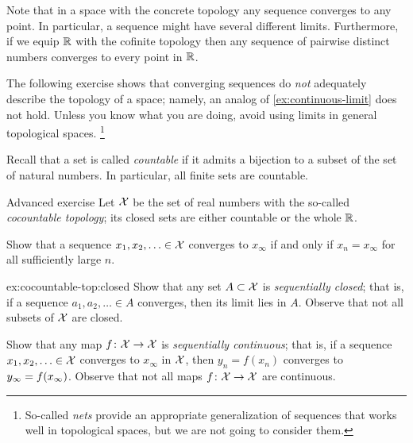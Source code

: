 Note that in a space with the concrete topology any sequence converges to any point.
In particular, a sequence might have several different limits.
Furthermore, if we equip $\mathbb{R}$ with the cofinite topology then any sequence of pairwise distinct numbers converges to every point in $\mathbb{R}$.

The following exercise shows that converging sequences do \textit{not} adequately describe the topology of a space;
namely, an analog of \ref{ex:continuous-limit} does not hold.
Unless you know what you are doing, avoid using limits in general topological spaces.%
\footnote{So-called \emph{nets} \cite{mcshane} provide an appropriate generalization of sequences that works well in topological spaces, but we are not going to consider them.}

Recall that a set is called \emph{countable} if it admits a bijection to a subset of the set of natural numbers.
In particular, all finite sets are countable.

\begin{thm}{Advanced exercise}\label{ex:cocountable-top}
Let $\mathcal{X}$ be the set of real numbers with the so-called \emph{cocountable topology};
its closed sets are either countable or the whole $\mathbb{R}$.

\begin{subthm}{}
Show that a sequence $x_1,x_2,\ldots \in \mathcal{X}$ converges to $x_\infty$ if and only if $x_n=x_\infty$ for all sufficiently large $n$.
\end{subthm}

\begin{subthm}{ex:cocountable-top:closed}
Show that any set $A\subset \mathcal{X}$ is \emph{sequentially closed};
that is, if a sequence $a_1,a_2,\ldots \in A$ converges, then its limit lies in $A$.
Observe that not all subsets of $\mathcal{X}$ are closed.
\end{subthm}

\begin{subthm}{}
Show that any map $f\colon\mathcal{X}\to \mathcal{X}$ is \emph{sequentially continuous};
that is, if a sequence $x_1,x_2,\ldots \in \mathcal{X}$ converges to $x_\infty$ in $\mathcal{X}$, then  $y_n=f(x_n)$ converges to $y_\infty\z=f(x_\infty)$.
Observe that not all maps $f\colon\mathcal{X}\to \mathcal{X}$ are continuous.
\end{subthm}

\end{thm}
